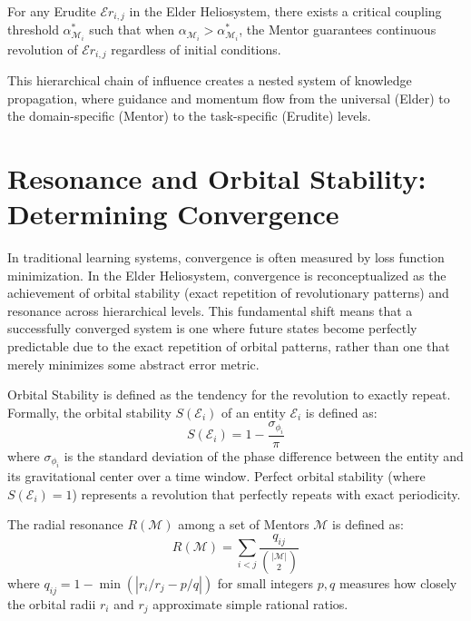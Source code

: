 \begin{corollary}
For any Erudite $\mathcal{E}r_{i,j}$ in the Elder Heliosystem, there exists a critical coupling threshold $\alpha_{\mathcal{M}_i}^*$ such that when $\alpha_{\mathcal{M}_i} > \alpha_{\mathcal{M}_i}^*$, the Mentor guarantees continuous revolution of $\mathcal{E}r_{i,j}$ regardless of initial conditions.
\end{corollary}

This hierarchical chain of influence creates a nested system of knowledge propagation, where guidance and momentum flow from the universal (Elder) to the domain-specific (Mentor) to the task-specific (Erudite) levels.

\section{Resonance and Orbital Stability: Determining Convergence}

In traditional learning systems, convergence is often measured by loss function minimization. In the Elder Heliosystem, convergence is reconceptualized as the achievement of orbital stability (exact repetition of revolutionary patterns) and resonance across hierarchical levels. This fundamental shift means that a successfully converged system is one where future states become perfectly predictable due to the exact repetition of orbital patterns, rather than one that merely minimizes some abstract error metric.

\begin{definition}
Orbital Stability is defined as the tendency for the revolution to exactly repeat. Formally, the orbital stability $S(\mathcal{E}_i)$ of an entity $\mathcal{E}_i$ is defined as:
\begin{equation}
S(\mathcal{E}_i) = 1 - \frac{\sigma_{\phi_i}}{\pi}
\end{equation}
where $\sigma_{\phi_i}$ is the standard deviation of the phase difference between the entity and its gravitational center over a time window. Perfect orbital stability (where $S(\mathcal{E}_i) = 1$) represents a revolution that perfectly repeats with exact periodicity.
\end{definition}

\begin{definition}
The radial resonance $R(\mathcal{M})$ among a set of Mentors $\mathcal{M}$ is defined as:
\begin{equation}
R(\mathcal{M}) = \sum_{i<j} \frac{q_{ij}}{\binom{|\mathcal{M}|}{2}}
\end{equation}
where $q_{ij} = 1 - \min(|r_i/r_j - p/q|)$ for small integers $p,q$ measures how closely the orbital radii $r_i$ and $r_j$ approximate simple rational ratios.
\end{definition}

